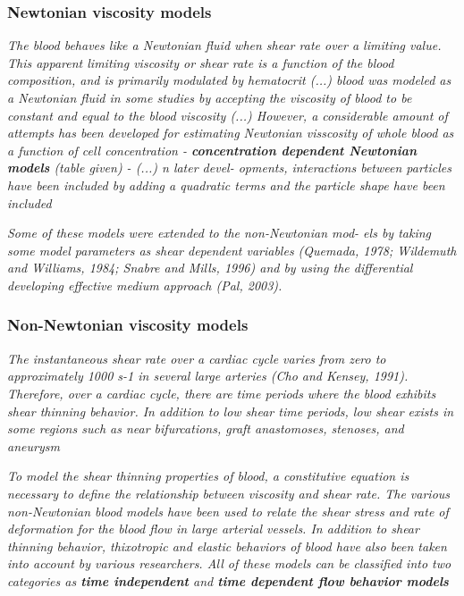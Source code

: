 \documentclass[11pt,letterpaper]{article}
\begin{document}
\subsubsection*{Newtonian viscosity models}\textit{The  blood behaves like a Newtonian  fluid when shear
rate over a limiting value. This apparent  limiting viscosity or shear rate is a function of  the blood  composition, and  is primarily modulated by hematocrit (...)  blood was modeled as a Newtonian fluid in some studies by accepting the viscosity of blood to be constant and equal to the blood viscosity (...) However, a considerable 
amount  of attempts has been developed for estimating Newtonian visscosity of whole blood as a  function of cell concentration - \textbf{concentration dependent
Newtonian models} (table given) - (...) n later devel- opments, interactions  between  particles have been  included by  adding a quadratic terms and the particle shape have been included}

\textit{Some of these models  were  extended to  the non-Newtonian mod- els by taking some model  parameters as shear dependent variables 
(Quemada, 1978;  Wildemuth and Williams,
1984; Snabre and  Mills, 1996)  and by  using the differential developing effective medium approach (Pal, 2003).}

\subsubsection*{Non-Newtonian viscosity models}
\textit{The instantaneous shear  rate  over  a cardiac cycle  varies from zero to  approximately 1000 s-1 in several large arteries  (Cho  and Kensey,  1991). Therefore, over a  cardiac cycle, there are  time periods where the blood exhibits shear thinning  behavior. In addition  to low  shear time  periods, low shear exists in some  regions such as near bifurcations, graft anastomoses, stenoses, and  aneurysm}



\textit{To model the  shear thinning properties of blood, a constitutive  equation is necessary to  define the relationship between  viscosity  and shear rate. The various non-Newtonian blood models have been  used to relate  the shear stress  and rate of deformation for  the blood flow  in large arterial  vessels. In addition  to shear thinning behavior, thixotropic and  elastic behaviors of blood have also been  taken into account  by various researchers. All of  these models can be  classified  into two categories as \textbf{time  independent}  and \textbf{time dependent flow behavior  models}}
\end{document}
